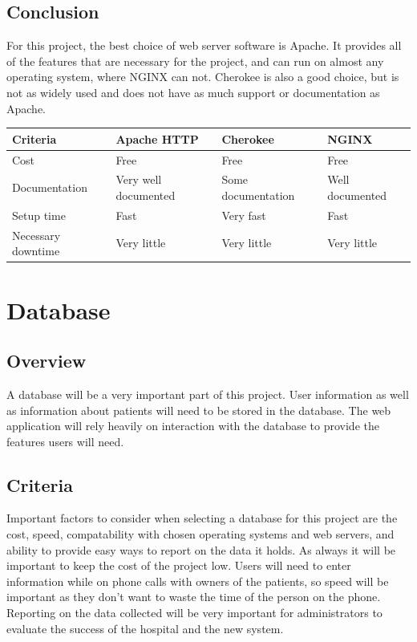 \documentclass[onecolumn, draftclsnofoot,10pt, compsoc]{IEEEtran}
\begin{document}
\subsection{Conclusion}
For this project, the best choice of web server software is Apache. It provides all of the features that are necessary for the project, and can run on almost any operating system, where NGINX can not. Cherokee is also a good choice, but is not as widely used and does not have as much support or documentation as Apache.

\begin{table}[h!]
\centering
\begin{tabular}{ |l|l|l|l| } 
\hline
\textbf{Criteria} & \textbf{Apache HTTP} & \textbf{Cherokee} & \textbf{NGINX} \\ \hline
Cost & Free & Free & Free \\ \hline
Documentation & Very well documented & Some documentation & Well documented \\ \hline
Setup time & Fast & Very fast & Fast \\ \hline
Necessary downtime & Very little & Very little & Very little \\ \hline
\end{tabular}
\end{table}

\section{Database}

\subsection{Overview}
A database will be a very important part of this project. User information as well as information about patients will need to be stored in the database. The web application will rely heavily on interaction with the database to provide the features users will need.

\subsection{Criteria}
Important factors to consider when selecting a database for this project are the cost, speed, compatability with chosen operating systems and web servers, and ability to provide easy ways to report on the data it holds. As always it will be important to keep the cost of the project low. Users will need to enter information while on phone calls with owners of the patients, so speed will be important as they don't want to waste the time of the person on the phone. Reporting on the data collected will be very important for administrators to evaluate the success of the hospital and the new system.
\end{document}
